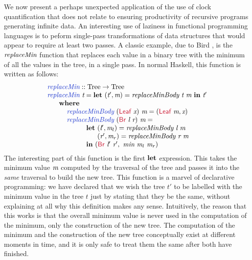 We now present a perhaps unexpected application of the use of clock
quantification that does not relate to ensuring productivity of
recursive programs generating infinite data. An interesting use of
laziness in functional programming languages is to peform single-pass
transformations of data structures that would appear to require at
least two passes. A classic example, due to Bird
\cite{bird84circular}, is the $\textit{replaceMin}$ function that
replaces each value in a binary tree with the minimum of all the
values in the tree, in a single pass. In normal Haskell, this function
is written as follows:
\begin{displaymath}
  \begin{array}{l}
    \defn{replaceMin} :: \tyname{Tree} \to \tyname{Tree} \\
    \defn{replaceMin}\ \ident{t} = \kw{let}\ (\ident{t$'$}, \ident{m}) = \ident{replaceMinBody}\ \ident{t}\ \ident{m}\ \kw{in}\ \ident{t$'$} \\
    \hspace{0.6cm} \kw{where} \\
    \hspace{1cm} \defn{replaceMinBody}\ (\cons{Leaf}\ \ident{x})\ \ident{m} = (\cons{Leaf}\ \ident{m}, \ident{x}) \\
    \hspace{1cm} \defn{replaceMinBody}\ (\cons{Br}\ \ident{l}\ \ident{r})\ \ident{m} = \\
    \hspace{2cm} \kw{let}\ (\ident{l$'$}, \ident{m$_l$}) = \ident{replaceMinBody}\ \ident{l}\ \ident{m} \\
    \hspace{2cm} \textcolor{white}{\kw{let}\ }(\ident{r$'$}, \ident{m$_r$}) = \ident{replaceMinBody}\ \ident{r}\ \ident{m} \\
    \hspace{2cm} \kw{in}\ (\cons{Br}\ \ident{l$'$}\ \ident{r$'$},\ \ident{min}\ \ident{m$_l$}\ \ident{m$_r$})
  \end{array}
\end{displaymath}
The interesting part of this function is the first $\textbf{let}$
expression. This takes the minimum value $\textit{m}$ computed by the
traversal of the tree and passes it into the \emph{same} traversal to
build the new tree. This function is a marvel of declarative
programming: we have declared that we wish the tree $t'$ to be
labelled with the minimum value in the tree $t$ just by stating that
they be the same, without explaining at all why this definition makes
any sense. Intuitively, the reason that this works is that the overall
minimum value is never used in the computation of the minimum, only
the construction of the new tree. The computation of the minimum and
the construction of the new tree conceptually exist at different
moments in time, and it is only safe to treat them the same after both
have finished.

